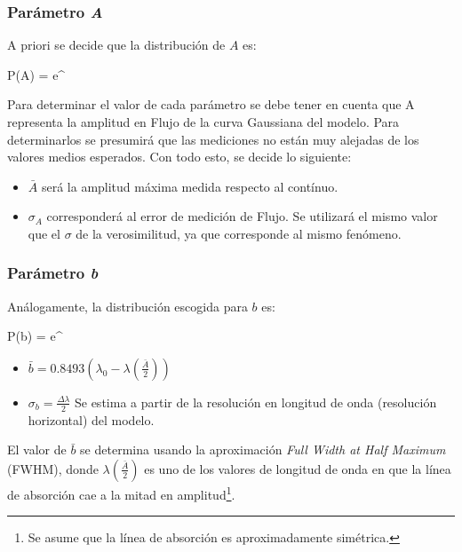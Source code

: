 \documentclass{article}
\begin{document}
\subsubsection{Parámetro \emph{A}}

A priori se decide que la distribución de $A$ es:

\begin{myequation}
P(A) =  e^{}
\label{ec:distr_A}
\end{myequation}

Para determinar el valor de cada parámetro se debe tener en cuenta que A representa la amplitud en Flujo de la curva Gaussiana del modelo. Para determinarlos se presumirá que las mediciones no están muy alejadas de los valores medios esperados. Con todo esto, se decide lo siguiente:

\begin{itemize}
\item $\bar A$ será la amplitud máxima medida respecto al contínuo.

\item $\sigma_A$ corresponderá al error de medición de Flujo. Se utilizará el mismo valor que el $\sigma$ de la verosimilitud, ya que corresponde al mismo fenómeno.
\end{itemize}

\subsubsection{Parámetro \emph{b}}
Análogamente, la distribución escogida para $b$ es:

\begin{myequation}
P(b) =  e^{}
\end{myequation}

\begin{itemize}
\item $\bar b = 0.8493(\lambda_0 - \lambda(\frac{\bar A}{2}))$

\item $\sigma_b = \frac{\Delta \lambda}{2}$ Se estima a partir de la resolución en longitud de onda (resolución horizontal) del modelo.
\end{itemize}

El valor de $\bar b$ se determina usando la aproximación \emph{Full Width at Half Maximum} (FWHM), donde $\lambda(\frac{\bar A}{2})$ es uno de los valores de longitud de onda en que la línea de absorción cae a la mitad en amplitud\footnote{ Se asume que la línea de absorción es aproximadamente simétrica.}.
\end{document}
